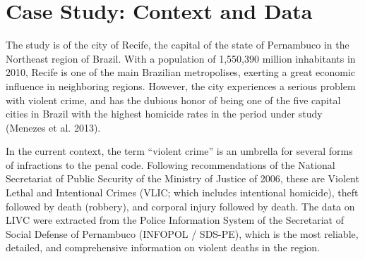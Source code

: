 \documentclass[smallextended]{svjour3}       %
\begin{document}
\hypertarget{case}{%
\section{Case Study: Context and Data}\label{case}}

The study is of the city of Recife, the capital of the state of
Pernambuco in the Northeast region of Brazil. With a population of
1,550,390 million inhabitants in 2010, Recife is one of the main
Brazilian metropolises, exerting a great economic influence in
neighboring regions. However, the city experiences a serious problem
with violent crime, and has the dubious honor of being one of the five
capital cities in Brazil with the highest homicide rates in the period
under study (Menezes et al. 2013).

In the current context, the term ``violent crime'' is an umbrella for
several forms of infractions to the penal code. Following
recommendations of the National Secretariat of Public Security of the
Ministry of Justice of 2006, these are Violent Lethal and Intentional
Crimes (VLIC; which includes intentional homicide), theft followed by
death (robbery), and corporal injury followed by death. The data on LIVC
were extracted from the Police Information System of the Secretariat of
Social Defense of Pernambuco (INFOPOL / SDS-PE), which is the most
reliable, detailed, and comprehensive information on violent deaths in
the region.
\end{document}

